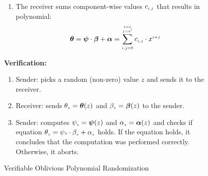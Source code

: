 \begin{figure}[ht]
\begin{center}
\begin{tcolorbox}[enhanced,width=3.3in,height=105mm,right=.5mm,
    drop fuzzy shadow southwest,
    colframe=black,colback=white]
\begin{enumerate}[leftmargin=-.2mm]
{\begin{enumerate}
 \item The receiver sums component-wise values $c_{\scriptscriptstyle i,j}$  that results in polynomial:
 \vspace{-3mm}
  $$\bm\theta=\bm\psi\cdot \bm\beta+\bm\alpha=\sum\limits^{\substack{\scriptscriptstyle i=e\\ \scriptscriptstyle j=e'}}_{\scriptscriptstyle i,j=0}c_{\scriptscriptstyle i, j}\cdot x^{\scriptscriptstyle i+j}$$ 
  \vspace{-3mm}
 




\end{enumerate}
\vspace{-1mm}
\item \label{Verification} \textbf{Verification:}
\begin{enumerate}%

\item \label{picking-random-x}Sender: picks a random (non-zero) value  $z$ and sends it to the receiver. 

\item\label{receiver-OLE-invocation} Receiver: sends $\theta_{\scriptscriptstyle z}=\bm\theta(z)$ and $\beta_{\scriptscriptstyle z}=\bm\beta(z)$ to the sender.

\item\label{receiver-OLE-invocation} Sender:  computes $\psi_{\scriptscriptstyle z}=\bm\psi(z)$ and $\alpha_{\scriptscriptstyle z}=\bm\alpha(z)$ and checks   if equation  $\theta_{\scriptscriptstyle z}=\psi{\scriptscriptstyle z}\cdot \beta_{\scriptscriptstyle z}+\alpha_{\scriptscriptstyle z}$ holds. If the equation holds, it concludes that the computation was performed correctly. Otherwise, it aborts. 
%
\end{enumerate}
}
 \end{enumerate}
 \end{tcolorbox}
\end{center}
\vspace{-4mm}
\caption{Verifiable Oblivious Polynomial Randomization} 
\label{fig:VOPR}
\vspace{-4mm}
\end{figure}
